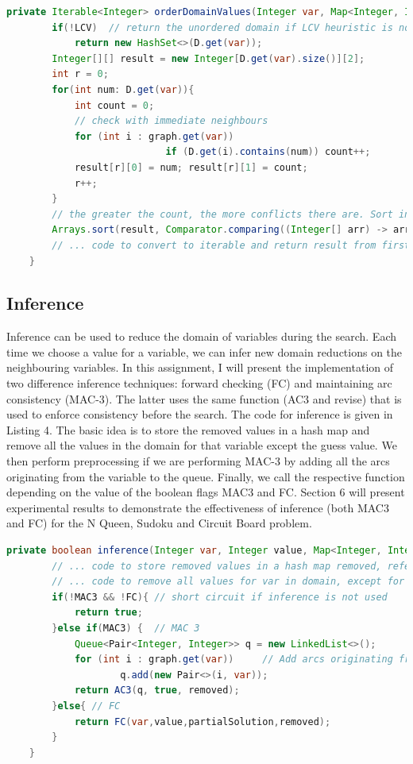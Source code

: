 \documentclass[9.5pt]{extarticle}
\begin{document}
\begin{lstlisting}[language=java,caption={orderDomainValues}]
	private Iterable<Integer> orderDomainValues(Integer var, Map<Integer, Integer> partialSolution) {
        if(!LCV)  // return the unordered domain if LCV heuristic is not used
            return new HashSet<>(D.get(var));
        Integer[][] result = new Integer[D.get(var).size()][2];
        int r = 0;
        for(int num: D.get(var)){
            int count = 0;
            // check with immediate neighbours
            for (int i : graph.get(var)) 
							if (D.get(i).contains(num))	count++;
            result[r][0] = num; result[r][1] = count;
            r++;
        }
        // the greater the count, the more conflicts there are. Sort in ascending order
        Arrays.sort(result, Comparator.comparing((Integer[] arr) -> arr[1]));
        // ... code to convert to iterable and return result from first column, refer to java file for detail
    }
\end{lstlisting} 

\subsection{Inference}

Inference can be used to reduce the domain of variables during the search. Each time we choose a value for a variable, we can infer new domain reductions on the neighbouring variables. In this assignment, I will present the implementation of two difference inference techniques: forward checking (FC) and maintaining arc consistency (MAC-3). The latter uses the same function (AC3 and revise) that is used to enforce consistency before the search. The code for inference is given in Listing 4. The basic idea is to store the removed values in a hash map and remove all the values in the domain for that variable except the guess value. We then perform preprocessing if we are performing MAC-3 by adding all the arcs originating from the variable to the queue. Finally, we call the respective function depending on the value of the boolean flags MAC3 and FC. Section 6 will present experimental results to demonstrate the effectiveness of inference (both MAC3 and FC) for the N Queen, Sudoku and Circuit Board problem.


\begin{lstlisting}[language=java,caption={inference}]
	private boolean inference(Integer var, Integer value, Map<Integer, Integer> partialSolution, Map<Integer, Set<Integer>> removed) {
        // ... code to store removed values in a hash map removed, refer to java file for details
        // ... code to remove all values for var in domain, except for the guess
        if(!MAC3 && !FC){ // short circuit if inference is not used
            return true;
        }else if(MAC3) {  // MAC 3
            Queue<Pair<Integer, Integer>> q = new LinkedList<>();
            for (int i : graph.get(var))	 // Add arcs originating from var to queue
                    q.add(new Pair<>(i, var));
            return AC3(q, true, removed);
        }else{ // FC
            return FC(var,value,partialSolution,removed);
        }
    }
\end{lstlisting} 
\end{document}
